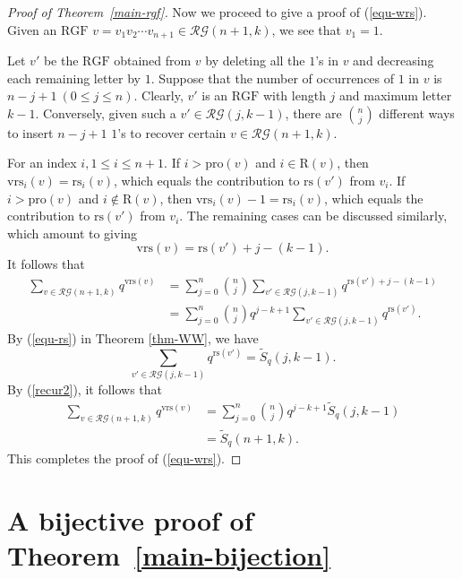 \documentclass[12pt]{amsart}
\numberwithin{equation}{section}
\theoremstyle{plain}
\theoremstyle{definition}
\def\RGF{\mathrm{RGF}}
\def\rs{\mathrm{rs}}
\def\wrs{\mathrm{vrs}}
\def\pl{\mathrm{pro}}
\def\RR{\mathrm{R}}
\def\RG{\mathcal{RG}}
\begin{document}
\begin{proof}[Proof of Theorem~\ref{main-rgf}]
Now we proceed to give a proof of (\ref{equ-wrs}).
Given an $\RGF$ $v=v_1 v_2 \cdots v_{n+1} \in \RG(n+1,k)$,
we see that $v_1=1$.

Let $v'$ be the $\RGF$ obtained from $v$ by
deleting all the $1$'s in $v$ and decreasing
each remaining letter by $1$. Suppose that the number of occurrences of $1$ in $v$ is $n-j+1~(0 \leq j \leq n)$. Clearly, $v'$
is an $\RGF$ with length $j$ and maximum letter $k-1$. Conversely, given such a $v'\in\RG(j,k-1)$, there are $\binom{n}{j}$ different ways to insert $n-j+1$ $1$'s to recover certain $v\in\RG(n+1,k)$.

For an index $i, 1\le i\le n+1$. If $i>\pl(v)$ and $i\in\RR(v)$, then $\wrs_i(v)=\rs_i(v)$, which equals the contribution to $\rs(v')$ from $v_i$. If $i>\pl(v)$ and $i\not\in\RR(v)$, then $\wrs_i(v)-1=\rs_i(v)$, which equals the contribution to $\rs(v')$ from $v_i$. The remaining cases can be discussed similarly, which amount to giving
\[\wrs(v)=\rs(v')+j-(k-1).\]
It follows that
\begin{align*}
  \sum_{v \in \RG(n+1,k)} q^{\wrs(v)}& = \sum_{j=0}^n  \binom{n}{j}  \sum_{v' \in \RG(j,k-1)} q^{\rs(v')+j-(k-1)}\\[5pt]
   &=\sum_{j=0}^n \binom{n}{j}  q^{j-k+1}\sum_{v' \in \RG(j,k-1)} q^{\rs(v')}.
\end{align*}
By (\ref{equ-rs}) in Theorem \ref{thm-WW},
we have
\begin{equation*}
  \sum_{v' \in \RG(j,k-1)} q^{\rs(v')}=\widetilde{S}_q(j,k-1).
\end{equation*}
By (\ref{recur2}), it follows that
\begin{align*}
  \sum_{v \in \RG(n+1,k)} q^{\wrs(v)} & =\sum_{j=0}^n \binom{n}{j}  q^{j-k+1} \widetilde{S}_q(j,k-1) \\[5pt]
   & = \widetilde{S}_q(n+1,k).
\end{align*}
This completes the proof of (\ref{equ-wrs}).
\end{proof}


\section{A bijective proof of Theorem~\ref{main-bijection}}\label{sec:involution}
\end{document}
